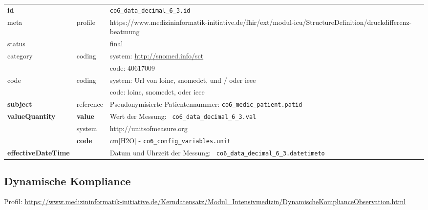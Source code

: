 \begin{longtable}{|l|l|p{7.5cm}|}
        \hline
        \rowcolor{lightgray} \multicolumn{3}{|l|}{Data Mapping (inhaltlich)} \\ \hline
        \textbf{id} &  & \texttt{co6\_data\_decimal\_6\_3.id} \\ \hline
	meta & profile & https://www.medizininformatik-initiative.de/fhir/ext/modul-icu/StructureDefinition/druckdifferenz-beatmung \\ \hline 
	status &  & final   \\ \hline 
	category & coding & system: \url{http://snomed.info/sct} \\
\cline{3-3}
	& & code: 40617009 \\ \hline
	code & coding & system: Url von \ac{loinc}, \ac{snomedct}, und / oder \ac{ieee} \\ 
	\cline{3-3} 
	 &  & code: \ac{loinc}, \ac{snomedct}, oder \ac{ieee} \\ \hline
	 \textbf{subject}  & reference & Pseudonymisierte Patientennummer: \texttt{co6\_medic\_patient.patid} \\ \hline
	 \textbf{valueQuantity}  & \textbf{value} & Wert der Messung: \texttt{
co6\_data\_decimal\_6\_3.val} \\
        \cline{2-3}
         & system & http://unitsofmeasure.org \\
         \cline{2-3}
         & \textbf{code} &
cm[H2O] - \texttt{co6\_config\_variables.unit}
\\ \hline
     \textbf{effectiveDateTime}  & & Datum und Uhrzeit der Messung: \texttt{
co6\_data\_decimal\_6\_3.datetimeto} \\ \hline
\end{longtable}

\subsection{Dynamische Kompliance} 

Profil: \url{https://www.medizininformatik-initiative.de/Kerndatensatz/Modul_Intensivmedizin/DynamischeKomplianceObservation.html}

